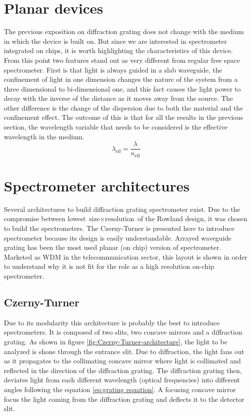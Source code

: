 \documentclass[12pt,twoside,english]{book}
\renewcommand{\~}{\perispomeni}%
\numberwithin{equation}{section}
\numberwithin{figure}{section}
\begin{document}
\section{Planar devices}

The previous exposition on diffraction grating does not change with the medium in which the device is built on. But since we are interested in spectrometer integrated on chips, it is worth highlighting the characteristics of this device. From this point two features stand out as very different from regular free space spectrometer. First is that light is always guided in a slab waveguide, the confinement of light in one dimension changes the nature of the system from a three dimensional to bi-dimensional one, and this fact causes the light power to decay with the inverse of the distance as it moves away from the source. The other difference is the change of the dispersion due to both the material and the confinement effect. The outcome of this is that for all the results in the previous section, the wavelength variable that needs to be considered is the effective wavelength in the medium.
\begin{equation}
\lambda_{\text{eff}}=\frac{\lambda}{n_{\text{eff}}}\end{equation}
\section{Spectrometer architectures}

Several architectures to build diffraction grating spectrometer exist. Due to the compromise between lowest $\text{size}\times \text{resolution}$ of the Rowland design, it was chosen to build the spectrometers. The Czerny-Turner is presented here to introduce spectrometer because its design is easily understandable. Arrayed waveguide grating has been the most used planar (on chip) version of spectrometer. Marketed as \gls{WDM} in the telecommunication sector, this layout is shown in order to understand why it is not fit for the role as a high resolution on-chip spectrometer. 

\subsection{Czerny-Turner}
\label{sub:Czerny-Turner}

Due to its modularity this architecture is probably the best to introduce spectrometers. It is composed of two slits, two concave mirrors and a diffraction grating. As shown in figure \ref{fig:Czerny-Turner-architecture}, the light to be analyzed is shone through the entrance slit. Due to diffraction, the light fans out as it propagates to the collimating concave mirror where light is collimated and reflected in the direction of the diffraction grating. The diffraction grating then, deviates light from each different wavelength (optical frequencies) into different angles following the equation \ref{eq:grating equation}. A focusing concave mirror focus the light coming from the diffraction grating and deflects it to the detector slit.
\end{document}

